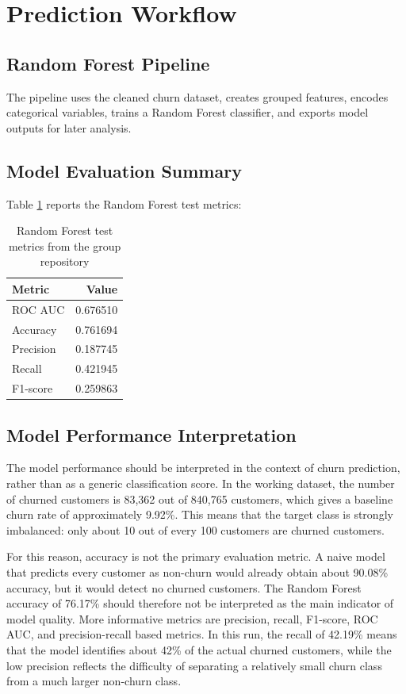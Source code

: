 \section{Prediction Workflow}

\subsection{Random Forest Pipeline}
The pipeline uses the cleaned churn dataset,
creates grouped features, encodes categorical variables, trains a Random Forest
classifier, and exports model outputs for later analysis.

\subsection{Model Evaluation Summary}
Table \ref{tab:test_metrics} reports the Random Forest test metrics:
\begin{table}[h]
\centering
\caption{Random Forest test metrics from the group repository}
\label{tab:test_metrics}
\begin{tabular}{lr}
\toprule
\textbf{Metric} & \textbf{Value} \\
\midrule
ROC AUC & 0.676510 \\
Accuracy & 0.761694 \\
Precision & 0.187745 \\
Recall & 0.421945 \\
F1-score & 0.259863 \\
\bottomrule
\end{tabular}
\end{table}

\subsection{Model Performance Interpretation}
The model performance should be interpreted in the context of churn prediction,
rather than as a generic classification score. In the working dataset, the
number of churned customers is 83,362 out of 840,765 customers, which gives a
baseline churn rate of approximately 9.92\%. This means that the target class is
strongly imbalanced: only about 10 out of every 100 customers are churned
customers.

For this reason, accuracy is not the primary evaluation metric. A naive model
that predicts every customer as non-churn would already obtain about 90.08\%
accuracy, but it would detect no churned customers. The Random Forest accuracy
of 76.17\% should therefore not be interpreted as the main indicator of model
quality. More informative metrics are precision, recall, F1-score, ROC AUC, and
precision-recall based metrics. In this run, the recall of 42.19\% means that
the model identifies about 42\% of the actual churned customers, while the low
precision reflects the difficulty of separating a relatively small churn class
from a much larger non-churn class.

